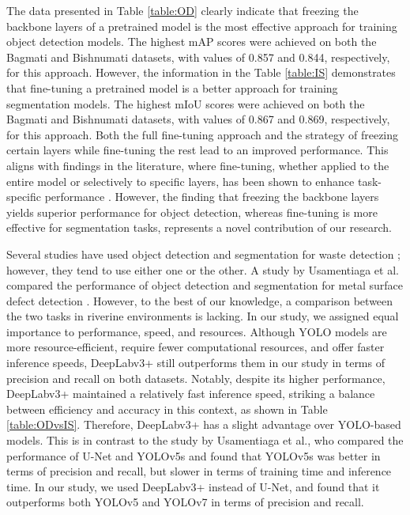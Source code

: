 \documentclass{ieeeaccess}
\begin{document}
The data presented in Table \ref{table:OD} clearly indicate that freezing the backbone layers of a pretrained model is the most effective approach for training object detection models. The highest mAP scores were achieved on both the Bagmati and Bishnumati datasets, with values of 0.857 and 0.844, respectively, for this approach. However, the information in the Table \ref{table:IS} demonstrates that fine-tuning a pretrained model is a better approach for training segmentation models. The highest mIoU scores were achieved on both the Bagmati and Bishnumati datasets, with values of 0.867 and 0.869, respectively, for this approach. Both the full fine-tuning approach and the strategy of freezing certain layers while fine-tuning the rest lead to an improved performance. This aligns with findings in the literature, where fine-tuning, whether applied to the entire model or selectively to specific layers, has been shown to enhance task-specific performance \cite{8099989}. However, the finding that freezing the backbone layers yields superior performance for object detection, whereas fine-tuning is more effective for segmentation tasks, represents a novel contribution of our research.

Several studies have used object detection \cite{Maharjan2022DetectionOR,  Yang2022DetectionOR, Nunkhaw2024AnIA} and segmentation for waste detection \cite{Tharani2021TrashDO, Jakovljevic2020ADL, Gmez2022ALA, ShijunPAN2024}; however, they tend to use either one or the other. A study by Usamentiaga et al. compared the performance of object detection and segmentation for metal surface defect detection \cite{Usamentiaga2022AutomatedSD}. However, to the best of our knowledge, a comparison between the two tasks in riverine environments is lacking. In our study, we assigned equal importance to performance, speed, and resources. Although YOLO models are more resource-efficient, require fewer computational resources, and offer faster inference speeds, DeepLabv3+ still outperforms them in our study in terms of precision and recall on both datasets. Notably, despite its higher performance, DeepLabv3+ maintained a relatively fast inference speed, striking a balance between efficiency and accuracy in this context, as shown in Table \ref{table:ODvsIS}. Therefore, DeepLabv3+ has a slight advantage over YOLO-based models. This is in contrast to the study by Usamentiaga et al., who compared the performance of U-Net and YOLOv5s and found that YOLOv5s was better in terms of precision and recall, but slower in terms of training time and inference time. In our study, we used DeepLabv3+ instead of U-Net, and found that it outperforms both YOLOv5 and YOLOv7 in terms of precision and recall.
\end{document}
